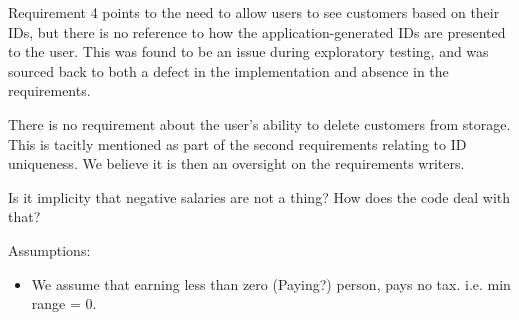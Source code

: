 
Requirement 4 points to the need to allow users to see customers based on their IDs, but there is no reference to how the application-generated IDs are presented to the user. This was found to be an issue during exploratory testing, and was sourced back to both a defect in the implementation and absence in the requirements. 

There is no requirement about the user's ability to delete customers from storage. This is tacitly mentioned as part of the second requirements relating to ID uniqueness. We believe it is then an oversight on the requirements writers. 


Is it implicity that negative salaries are not a thing? How does the code deal with that? 

Assumptions: 
\begin{itemize}
	\item We assume that earning less than zero (Paying?) person, pays no tax. i.e. min range = 0. 
\end{itemize}



